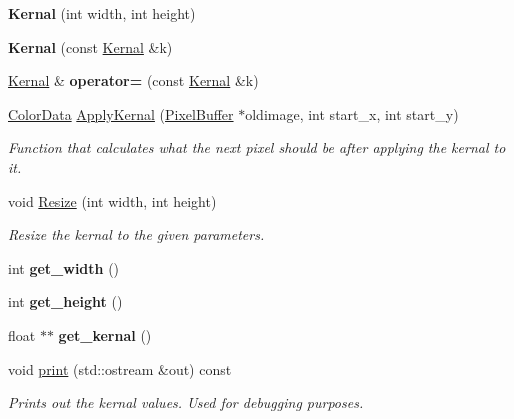 \begin{DoxyCompactItemize}
\item 
{\bfseries Kernal} (int width, int height)\hypertarget{classKernal_a55bacf5179ed4b74bd06c2ab2f46edb6}{}\label{classKernal_a55bacf5179ed4b74bd06c2ab2f46edb6}

\item 
{\bfseries Kernal} (const \hyperlink{classKernal}{Kernal} \&k)\hypertarget{classKernal_afb88d9b7df9f59fb9c84fe3a9fdb522d}{}\label{classKernal_afb88d9b7df9f59fb9c84fe3a9fdb522d}

\item 
\hyperlink{classKernal}{Kernal} \& {\bfseries operator=} (const \hyperlink{classKernal}{Kernal} \&k)\hypertarget{classKernal_aa98f75930d374bd578f4530991b0f256}{}\label{classKernal_aa98f75930d374bd578f4530991b0f256}

\item 
\hyperlink{classimage__tools_1_1ColorData}{Color\+Data} \hyperlink{classKernal_aaee07d8a1316e8e72d85bd9e81d7ddce}{Apply\+Kernal} (\hyperlink{classimage__tools_1_1PixelBuffer}{Pixel\+Buffer} $\ast$oldimage, int start\+\_\+x, int start\+\_\+y)
\begin{DoxyCompactList}\small\item\em Function that calculates what the next pixel should be after applying the kernal to it. \end{DoxyCompactList}\item 
void \hyperlink{classKernal_ab68b45c23fc5d6f8957ed757bd8772f9}{Resize} (int width, int height)\hypertarget{classKernal_ab68b45c23fc5d6f8957ed757bd8772f9}{}\label{classKernal_ab68b45c23fc5d6f8957ed757bd8772f9}

\begin{DoxyCompactList}\small\item\em Resize the kernal to the given parameters. \end{DoxyCompactList}\item 
int {\bfseries get\+\_\+width} ()\hypertarget{classKernal_a43fc65406d9950976155ac7ac7fa47a5}{}\label{classKernal_a43fc65406d9950976155ac7ac7fa47a5}

\item 
int {\bfseries get\+\_\+height} ()\hypertarget{classKernal_a710ef2e886631ddf6bdfbbf186cdf50a}{}\label{classKernal_a710ef2e886631ddf6bdfbbf186cdf50a}

\item 
float $\ast$$\ast$ {\bfseries get\+\_\+kernal} ()\hypertarget{classKernal_a9949e8c60832b9468449b18a0b68ac36}{}\label{classKernal_a9949e8c60832b9468449b18a0b68ac36}

\item 
void \hyperlink{classKernal_acb794ffafc22adbe00e9473833fad933}{print} (std\+::ostream \&out) const \hypertarget{classKernal_acb794ffafc22adbe00e9473833fad933}{}\label{classKernal_acb794ffafc22adbe00e9473833fad933}

\begin{DoxyCompactList}\small\item\em Prints out the kernal values. Used for debugging purposes. \end{DoxyCompactList}\end{DoxyCompactItemize}
